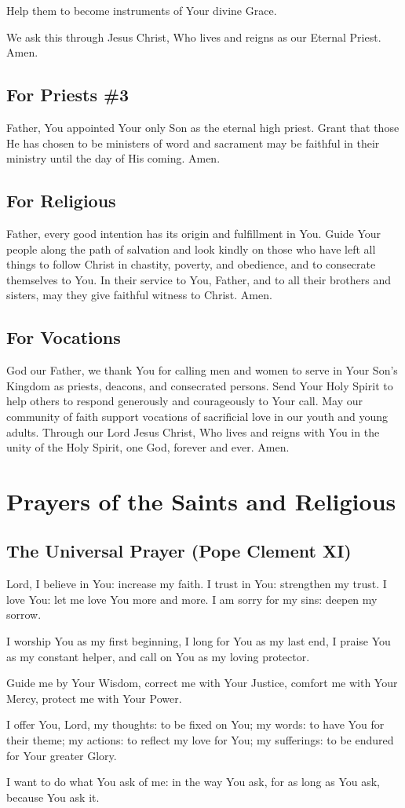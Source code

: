 \documentclass[12pt]{article}
\newcommand{\prayersection}[1]{\section{#1}}
\newcommand{\prayertitle}[1]{\subsection{#1}}
\begin{document}
Help them to become instruments of Your divine Grace.

We ask this through Jesus Christ, Who lives and reigns as our Eternal Priest.
Amen.

\prayertitle{For Priests \#3}
Father, You appointed Your only Son as the eternal high priest.
Grant that those He has chosen to be ministers of word and sacrament may be faithful in their ministry until the day of His coming.
Amen.

\prayertitle{For Religious}
Father, every good intention has its origin and fulfillment in You.
Guide Your people along the path of salvation and look kindly on those who have left all things to follow Christ in chastity, poverty, and obedience, and to consecrate themselves to You.
In their service to You, Father, and to all their brothers and sisters, may they give faithful witness to Christ.
Amen.

\prayertitle{For Vocations}
God our Father, we thank You for calling men and women to serve in Your Son's Kingdom as priests, deacons, and consecrated persons.
Send Your Holy Spirit to help others to respond generously and courageously to Your call.
May our community of faith support vocations of sacrificial love in our youth and young adults.
Through our Lord Jesus Christ, Who lives and reigns with You in the unity of the Holy
Spirit, one God, forever and ever.
Amen.

\newpage

\prayersection{Prayers of the Saints and Religious}
\prayertitle{The Universal Prayer (Pope Clement XI)}
Lord, I believe in You: increase my faith.
I  trust in You: strengthen my trust.
I love You: let me love You more and more.
I am sorry for my sins: deepen my sorrow.

I worship You as my first beginning, I long for You as my last end, I praise You as my constant helper, and call on You as my loving protector.

Guide me by Your Wisdom,
correct me with Your Justice,
comfort me with Your Mercy,
protect me with Your Power.

I offer You, Lord, my thoughts: to be fixed on You;
my words: to have You for their theme;
my actions: to reflect my love for You;
my sufferings: to be endured for Your greater Glory.

I want to do what You ask of me:
in the way You ask,
for as long as You ask,
because You ask it.
\end{document}
